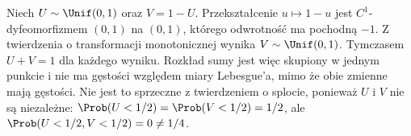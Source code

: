 \begin{przyklad}
Niech $U\sim\Unif(0,1)$ oraz $V=1-U$.
Przekształcenie $u\mapsto1-u$ jest $C^1$-dyfeomorfizmem
$(0,1)$ na $(0,1)$, którego odwrotność ma pochodną $-1$.
Z twierdzenia o transformacji monotonicznej wynika
$V\sim\Unif(0,1)$. Tymczasem $U+V=1$ dla każdego wyniku. Rozkład sumy jest więc skupiony
w jednym punkcie i nie ma gęstości względem miary
Lebesgue'a, mimo że obie zmienne mają gęstości.
Nie jest to sprzeczne z twierdzeniem o splocie,
ponieważ $U$ i $V$ nie są niezależne:
$\Prob(U<1/2)=\Prob(V<1/2)=1/2$, ale
$\Prob(U<1/2,V<1/2)=0\neq1/4$.
\end{przyklad}


